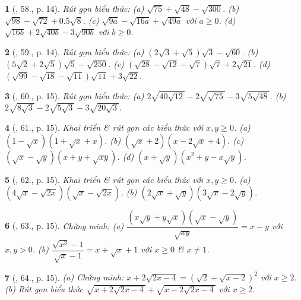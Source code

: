 \documentclass{article}
\newtheorem{baitoan}{}
\begin{document}
\begin{baitoan}[\cite{SBT_Toan_9_tap_1}, 58., p. 14]
	Rút gọn biểu thức: (a) $\sqrt{75} + \sqrt{48} - \sqrt{300}$. (b) $\sqrt{98} - \sqrt{72} + 0.5\sqrt{8}$. (c) $\sqrt{9a} - \sqrt{16a} + \sqrt{49a}$ với $a\ge0$. (d) $\sqrt{16b} + 2\sqrt{40b} - 3\sqrt{90b}$ với $b\ge0$.
\end{baitoan}

\begin{baitoan}[\cite{SBT_Toan_9_tap_1}, 59., p. 14]
	Rút gọn biểu thức: (a) $(2\sqrt{3} + \sqrt{5})\sqrt{3} - \sqrt{60}$. (b) $(5\sqrt{2} + 2\sqrt{5})\sqrt{5} - \sqrt{250}$. (c) $(\sqrt{28} - \sqrt{12} - \sqrt{7})\sqrt{7} + 2\sqrt{21}$. (d) $(\sqrt{99} - \sqrt{18} - \sqrt{11})\sqrt{11} + 3\sqrt{22}$.
\end{baitoan}

\begin{baitoan}[\cite{SBT_Toan_9_tap_1}, 60., p. 15]
	Rút gọn biểu thức: (a) $2\sqrt{40\sqrt{12}} - 2\sqrt{\sqrt{75}} - 3\sqrt{5\sqrt{48}}$. (b) $2\sqrt{8\sqrt{3}} - 2\sqrt{5\sqrt{3}} - 3\sqrt{20\sqrt{3}}$. 
\end{baitoan}

\begin{baitoan}[\cite{SBT_Toan_9_tap_1}, 61., p. 15]
	Khai triển \& rút gọn các biểu thức với $x,y\ge0$. (a) $(1 - \sqrt{x})(1 + \sqrt{x} + x)$. (b) $(\sqrt{x} + 2)(x - 2\sqrt{x} + 4)$. (c) $(\sqrt{x} - \sqrt{y})(x + y + \sqrt{xy})$. (d) $(x + \sqrt{y})(x^2 + y - x\sqrt{y})$.
\end{baitoan}

\begin{baitoan}[\cite{SBT_Toan_9_tap_1}, 62., p. 15]
	Khai triển \& rút gọn các biểu thức với $x,y\ge0$. (a) $(4\sqrt{x} - \sqrt{2x})(\sqrt{x} - \sqrt{2x})$. (b) $(2\sqrt{x} + \sqrt{y})(3\sqrt{x} - 2\sqrt{y})$.
\end{baitoan}

\begin{baitoan}[\cite{SBT_Toan_9_tap_1}, 63., p. 15]
	Chứng minh: (a) $\dfrac{(x\sqrt{y} + y\sqrt{x})(\sqrt{x} - \sqrt{y})}{\sqrt{xy}} = x - y$ với $x,y > 0$. (b) $\dfrac{\sqrt{x^3} - 1}{\sqrt{x} - 1} = x + \sqrt{x} + 1$ với $x\ge0$ \& $x\ne1$.
\end{baitoan}

\begin{baitoan}[\cite{SBT_Toan_9_tap_1}, 64., p. 15]
	(a) Chứng minh: $x + 2\sqrt{2x - 4} = (\sqrt{2} + \sqrt{x - 2})^2$ với $x\ge2$. (b) Rút gọn biểu thức $\sqrt{x + 2\sqrt{2x - 4}} + \sqrt{x - 2\sqrt{2x - 4}}$ với $x\ge2$.
\end{baitoan}
\end{document}
